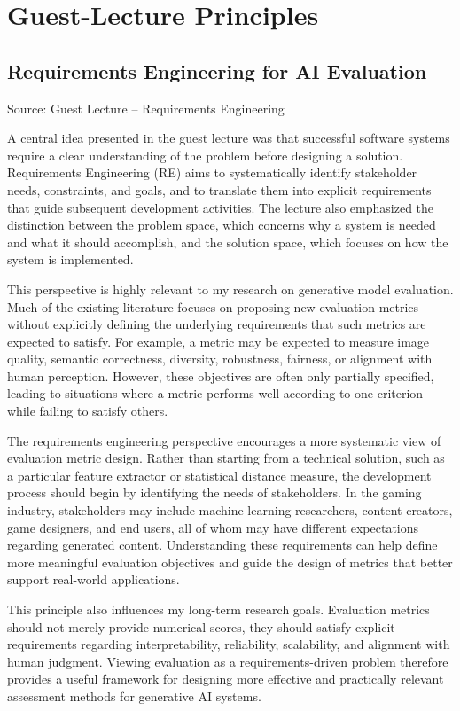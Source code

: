 \documentclass{article}
\begin{document}
\section{Guest-Lecture Principles}

\subsection{Requirements Engineering for AI Evaluation}


Source: Guest Lecture -- Requirements Engineering

A central idea presented in the guest lecture was that successful software systems require a clear understanding of the problem before designing a solution. Requirements Engineering (RE) aims to systematically identify stakeholder needs, constraints, and goals, and to translate them into explicit requirements that guide subsequent development activities. The lecture also emphasized the distinction between the problem space, which concerns why a system is needed and what it should accomplish, and the solution space, which focuses on how the system is implemented.

This perspective is highly relevant to my research on generative model evaluation. Much of the existing literature focuses on proposing new evaluation metrics without explicitly defining the underlying requirements that such metrics are expected to satisfy. For example, a metric may be expected to measure image quality, semantic correctness, diversity, robustness, fairness, or alignment with human perception. However, these objectives are often only partially specified, leading to situations where a metric performs well according to one criterion while failing to satisfy others.

The requirements engineering perspective encourages a more systematic view of evaluation metric design. Rather than starting from a technical solution, such as a particular feature extractor or statistical distance measure, the development process should begin by identifying the needs of stakeholders. In the gaming industry, stakeholders may include machine learning researchers, content creators, game designers, and end users, all of whom may have different expectations regarding generated content. Understanding these requirements can help define more meaningful evaluation objectives and guide the design of metrics that better support real-world applications.

This principle also influences my long-term research goals. Evaluation metrics should not merely provide numerical scores, they should satisfy explicit requirements regarding interpretability, reliability, scalability, and alignment with human judgment. Viewing evaluation as a requirements-driven problem therefore provides a useful framework for designing more effective and practically relevant assessment methods for generative AI systems.
\end{document}
